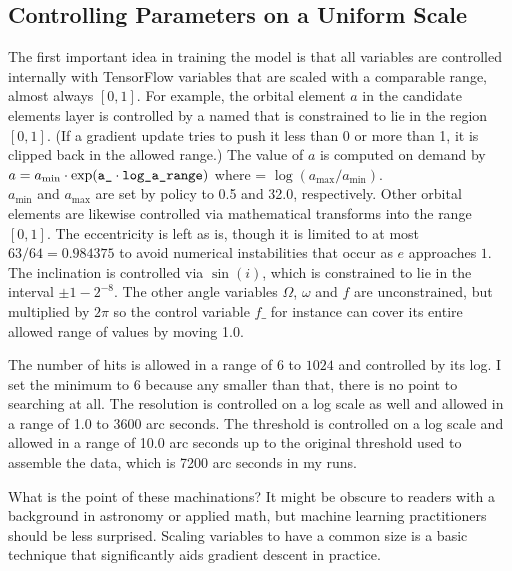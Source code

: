 \subsection{Controlling Parameters on a Uniform Scale}
The first important idea in training the model is that all variables are controlled internally 
with TensorFlow variables that are scaled with a comparable range, almost always $[0, 1]$.
For example, the orbital element $a$ in the candidate elements layer is controlled by a 
named  that is constrained to lie in the region $[0, 1]$.
(If a gradient update tries to push it less than 0 or more than 1, it is clipped back in the allowed range.)
The value of $a$ is computed on demand by
$a = a_{\mathrm{min}} \cdot \exp( \texttt{a\_} \cdot \texttt{log\_a\_range})$ 
where  = $\log(a_{\mathrm{max}} / a_{\mathrm{min}})$.\\
$a_{\mathrm{min}}$ and $a_{\mathrm{max}}$ are set by policy to 0.5 and 32.0, respectively.
Other orbital elements are likewise controlled via mathematical transforms into the range $[0, 1]$.
The eccentricity is left as is, though it is limited to at most $63 / 64 = 0.984375$ to avoid numerical instabilities that occur as $e$ approaches $1$.
The inclination is controlled via $\sin(i)$, which is constrained to lie in the interval $\pm 1 - 2^{-8}$.
The other angle variables $\Omega$, $\omega$ and $f$ are unconstrained, but multiplied by $2 \pi$ 
so the control variable $f\_$ for instance can cover its entire allowed range of values by moving 1.0.

The number of hits  is allowed in a range of $6$ to $1024$ and controlled by its log.
I set the minimum to $6$ because any smaller than that, there is no point to searching at all.
The resolution is controlled on a log scale as well and allowed in a range of 1.0 to 3600 arc seconds.
The threshold is controlled on a log scale and allowed in a range of 10.0 arc seconds 
up to the original threshold used to assemble the data, which is 7200 arc seconds in my runs.

What is the point of these machinations?
It might be obscure to readers with a background in astronomy or applied math, but machine learning practitioners should be less surprised.
Scaling variables to have a common size is a basic technique that significantly aids gradient descent in practice.

